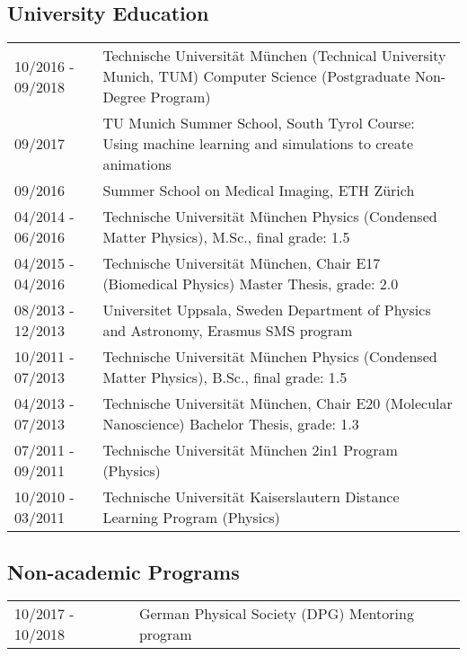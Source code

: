 \documentclass[a4paper,10pt]{memoir}
\begin{document}
\subsection*{University Education}
\vspace*{-\baselineskip}
\begin{longtable}{@{}p{} p{}}
  10/2016 - 09/2018 &
  Technische Universität München (Technical University Munich, TUM) \newline
  Computer Science (Postgraduate Non-Degree Program)
  \\
  09/2017 &
  TU Munich Summer School, South Tyrol \newline
  Course: Using machine learning and simulations to create animations
  \\
  09/2016 &
  Summer School on Medical Imaging, ETH Zürich 
  \\
  04/2014 - 06/2016 &
  Technische Universität München \newline 
  Physics (Condensed Matter Physics), M.Sc., final grade: 1.5
  \\
  04/2015 - 04/2016 &
  Technische Universität München, Chair E17 (Biomedical Physics) \newline 
  Master Thesis, grade: 2.0
  \\
  08/2013 - 12/2013 &
  Universitet Uppsala, Sweden \newline 
  Department of Physics and Astronomy, Erasmus SMS program 
  \\
  10/2011 - 07/2013 &
  Technische Universität München \newline 
  Physics (Condensed Matter Physics), B.Sc., final grade: 1.5 
  \\
  04/2013 - 07/2013 &
  Technische Universität München, Chair E20 (Molecular Nanoscience) \newline 
  Bachelor Thesis, grade: 1.3
  \\
  07/2011 - 09/2011 &
  Technische Universität München \newline
  2in1 Program (Physics)
  \\
  10/2010 - 03/2011 &
  Technische Universität Kaiserslautern \newline 
  Distance Learning Program (Physics)
\end{longtable}

\subsection*{Non-academic Programs}
\vspace*{-\baselineskip}
\begin{longtable}{@{}p{} p{}}
  10/2017 - 10/2018 &
  German Physical Society (DPG) \newline
  Mentoring program
\end{longtable}
\end{document}
